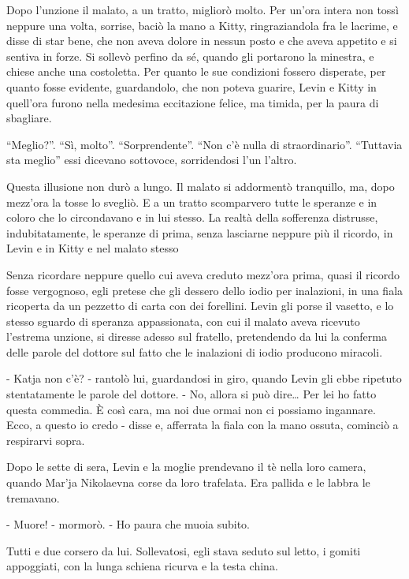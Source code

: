 Dopo l'unzione il malato, a un tratto, migliorò molto. Per un'ora intera non tossì neppure una volta, sorrise, baciò la mano a Kitty, ringraziandola fra le lacrime, e disse di star bene, che non aveva dolore in nessun posto e che aveva appetito e si sentiva in forze. Si sollevò perfino da sé, quando gli portarono la minestra, e chiese anche una costoletta. Per quanto le sue condizioni fossero disperate, per quanto fosse evidente, guardandolo, che non poteva guarire, Levin e Kitty in quell'ora furono nella medesima eccitazione felice, ma timida, per la paura di sbagliare. 

``Meglio?''. ``Sì, molto''. ``Sorprendente''. ``Non c'è nulla di straordinario''. ``Tuttavia sta meglio'' essi dicevano sottovoce, sorridendosi l'un l'altro. 

Questa illusione non durò a lungo. Il malato si addormentò tranquillo, ma, dopo mezz'ora la tosse lo svegliò. E a un tratto scomparvero tutte le speranze e in coloro che lo circondavano e in lui stesso. La realtà della sofferenza distrusse, indubitatamente, le speranze di prima, senza lasciarne neppure più il ricordo, in Levin e in Kitty e nel malato stesso 

Senza ricordare neppure quello cui aveva creduto mezz'ora prima, quasi il ricordo fosse vergognoso, egli pretese che gli dessero dello iodio per inalazioni, in una fiala ricoperta da un pezzetto di carta con dei forellini. Levin gli porse il vasetto, e lo stesso sguardo di speranza appassionata, con cui il malato aveva ricevuto l'estrema unzione, si diresse adesso sul fratello, pretendendo da lui la conferma delle parole del dottore sul fatto che le inalazioni di iodio producono miracoli. 

- Katja non c'è? - rantolò lui, guardandosi in giro, quando Levin gli ebbe ripetuto stentatamente le parole del dottore. - No, allora si può dire\ldots{} Per lei ho fatto questa commedia. È così cara, ma noi due ormai non ci possiamo ingannare. Ecco, a questo io credo - disse e, afferrata la fiala con la mano ossuta, cominciò a respirarvi sopra. 

Dopo le sette di sera, Levin e la moglie prendevano il tè nella loro camera, quando Mar'ja Nikolaevna corse da loro trafelata. Era pallida e le labbra le tremavano. 

- Muore! - mormorò. - Ho paura che muoia subito. 

Tutti e due corsero da lui. Sollevatosi, egli stava seduto sul letto, i gomiti appoggiati, con la lunga schiena ricurva e la testa china. 

